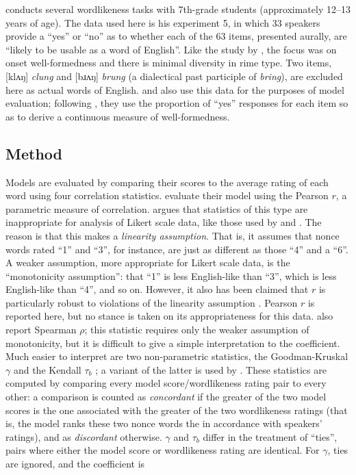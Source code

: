 \citet{Scholes1966} conducts several wordlikeness tasks with 7th-grade students (approximately 12--13 years of age). The data used here is his experiment 5, in which 33 speakers provide a ``yes'' or ``no'' as to whether each of the 63 items, presented aurally, are ``likely to be usable as a word of English''. Like the study by \citet{Albright2007}, the focus was on onset well-formedness and there is minimal diversity in rime type. Two items, [klʌŋ] \emph{clung} and [bɹʌŋ] \emph{brung} (a dialectical past participle of \emph{bring}), are excluded here as actual words of English. \citet{Albright2009a} and \citet{Hayes2008a} also use this data for the purposes of model evaluation; following \citet{Frisch2000}, they use the proportion of ``yes'' responses for each item so as to derive a continuous measure of well-formedness.

\subsection{Method}

Models are evaluated by comparing their scores to the average rating of each word using four correlation statistics. \citet{Hayes2008a} evaluate their model using the Pearson $r$, a parametric measure of correlation. \citet{Stevens1946} argues that statistics of this type are inappropriate for analysis of Likert scale data, like those used by \citet{Albright2009a} and \citet{Albright2003b}. The reason is that this makes a \emph{linearity assumption}. That is, it assumes that nonce words rated ``1'' and  ``3'', for instance, are just as different as those ``4'' and a ``6''. A weaker assumption, more appropriate for Likert scale data, is the ``monotonicity assumption'': that ``1'' is less English-like than ``3'', which is less English-like than ``4'', and so on. However, it also has been claimed that $r$ is particularly robust to violations of the linearity assumption \citep[e.g.,][]{Havlicek1976}. Pearson $r$ is reported here, but no stance is taken on its appropriateness for this data.
\citeauthor{Hayes2008a} also report Spearman $\rho$; this statistic requires only the weaker assumption of monotonicity, but it is difficult to give a simple interpretation to the coefficient. Much easier to interpret are two non-parametric statistics, the Goodman-Kruskal $\gamma$ and the Kendall $\tau_b$ \citep{Noether1981}; a variant of the latter is used by \citet{Albright2009a}. These statistics are computed by comparing every model score/wordlikeness rating pair to every other: a comparison is counted as \emph{concordant} if the greater of the two model scores is the one associated with the greater of the two wordlikeness ratings (that is, the model ranks these two nonce words the in accordance with speakers' ratings), and as \emph{discordant} otherwise. $\gamma$ and $\tau_b$ differ in the treatment of ``ties'', pairs where either the model score or wordlikeness rating are identical. For $\gamma$, ties are ignored, and the coefficient is 

